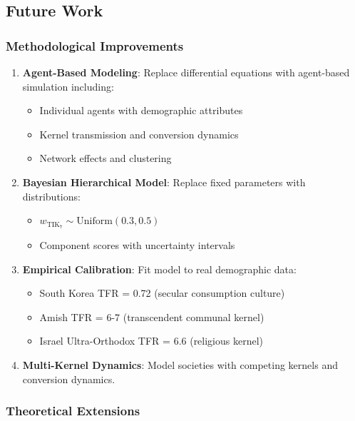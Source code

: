 \documentclass[11pt,a4paper]{article}
\theoremstyle{definition}
\theoremstyle{remark}
\begin{document}
\subsection{Future Work}

\subsubsection{Methodological Improvements}

\begin{enumerate}
    \item \textbf{Agent-Based Modeling}: Replace differential equations with agent-based simulation including:
    \begin{itemize}
        \item Individual agents with demographic attributes
        \item Kernel transmission and conversion dynamics
        \item Network effects and clustering
    \end{itemize}
    
    \item \textbf{Bayesian Hierarchical Model}: Replace fixed parameters with distributions:
    \begin{itemize}
        \item $w_{\text{TIK}_7} \sim \text{Uniform}(0.3, 0.5)$
        \item Component scores with uncertainty intervals
    \end{itemize}
    
    \item \textbf{Empirical Calibration}: Fit model to real demographic data:
    \begin{itemize}
        \item South Korea TFR = 0.72 (secular consumption culture)
        \item Amish TFR = 6-7 (transcendent communal kernel)
        \item Israel Ultra-Orthodox TFR = 6.6 (religious kernel)
    \end{itemize}
    
    \item \textbf{Multi-Kernel Dynamics}: Model societies with competing kernels and conversion dynamics.
\end{enumerate}

\subsubsection{Theoretical Extensions}
\end{document}
